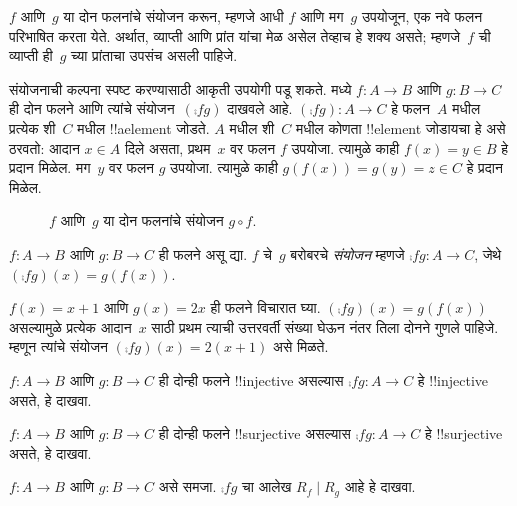 \documentclass[../../../include/open-logic-section]{subfiles}
\begin{document}

\begin{explain}
$f$ आणि~$g$ या दोन
फलनांचे संयोजन करून, म्हणजे आधी $f$ आणि मग~$g$ उपयोजून,
एक नवे फलन परिभाषित करता येते. अर्थात, व्याप्ती आणि प्रांत यांचा मेळ
असेल तेव्हाच हे शक्य असते; म्हणजे~$f$ ची व्याप्ती ही~$g$ च्या प्रांताचा
उपसंच असली पाहिजे. 

संयोजनाची कल्पना स्पष्ट करण्यासाठी आकृती उपयोगी पडू शकते.
 मध्ये $f \colon A \to B$ आणि $g \colon B \to C$
ही दोन फलने आणि त्यांचे संयोजन~$(\comp{f}{g})$ दाखवले आहे.
$(\comp{f}{g}) \colon A \to C$ हे फलन~$A$ मधील प्रत्येक शी~$C$ मधील !!a{element} जोडते. $A$ मधील शी~$C$
मधील कोणता !!{element} जोडायचा हे असे ठरवतो: आदान $x \in A$
दिले असता, प्रथम~$x$ वर फलन $f$ उपयोजा. त्यामुळे काही
$f(x) = y \in B$ हे प्रदान मिळेल. मग~$y$ वर फलन $g$ उपयोजा.
त्यामुळे काही $g(f(x)) = g(y) = z \in C$ हे प्रदान मिळेल.
\begin{figure}
  \caption{$f$ आणि~$g$ या दोन फलनांचे संयोजन $g \circ f$.}
\end{figure}
\end{explain}

\begin{defn}[संयोजन]
$f\colon A \to B$ आणि $g\colon B \to C$ ही फलने असू द्या.
$f$ चे~$g$ बरोबरचे \emph{संयोजन} म्हणजे $\comp{f}{g} \colon A \to C$,
जेथे $(\comp{f}{g})(x) = g(f(x))$.
\end{defn}

\begin{ex}
$f(x) = x + 1$ आणि $g(x) = 2x$ ही फलने विचारात घ्या.
$(\comp{f}{g})(x) = g(f(x))$ असल्यामुळे प्रत्येक आदान~$x$ साठी
प्रथम त्याची उत्तरवर्ती संख्या घेऊन नंतर तिला दोनने गुणले पाहिजे.
म्हणून त्यांचे संयोजन $(\comp{f}{g})(x) = 2(x+1)$ असे मिळते.
\end{ex}

\begin{prob}
$f \colon A \to B$ आणि $g \colon B \to C$ ही दोन्ही फलने
!!{injective} असल्यास $\comp{f}{g}\colon A \to C$ हे
!!{injective} असते, हे दाखवा.
\end{prob}

\begin{prob}
$f \colon A \to B$ आणि $g \colon B \to C$ ही दोन्ही फलने
!!{surjective} असल्यास $\comp{f}{g}\colon A \to C$ हे
!!{surjective} असते, हे दाखवा.
\end{prob}

\begin{prob}
$f \colon A \to B$ आणि $g \colon B \to C$ असे समजा.
$\comp{f}{g}$ चा आलेख $R_f \mid R_g$ आहे हे दाखवा.
\end{prob}
\end{document}
